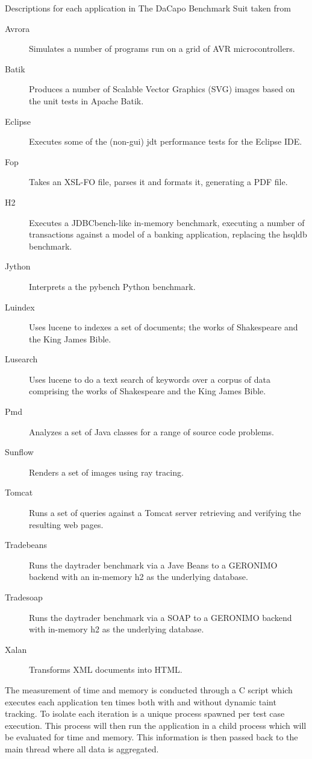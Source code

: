 \begin{table}[H]
  \centering
  \caption{Descriptions for each application in The DaCapo Benchmark Suit taken from \textcite{dacapoBench}}
    \label{table:DaCapoTests}
    \begin{description}
        \item [Avrora] Simulates a number of programs run on a grid of AVR microcontrollers.
        \item [Batik] Produces a number of Scalable Vector Graphics (SVG) images based on the unit tests in Apache Batik.
        \item [Eclipse] Executes some of the (non-gui) jdt performance tests for the Eclipse IDE.
        \item [Fop] Takes an XSL-FO file, parses it and formats it, generating a PDF file.
        \item [H2] Executes a JDBCbench-like in-memory benchmark, executing a number of transactions against a model of a banking application, replacing the hsqldb benchmark.
        \item [Jython] Interprets a the pybench Python benchmark.
        \item [Luindex] Uses lucene to indexes a set of documents; the works of Shakespeare and the King James Bible.
        \item [Lusearch] Uses lucene to do a text search of keywords over a corpus of data comprising the works of Shakespeare and the King James Bible.
        \item [Pmd] Analyzes a set of Java classes for a range of source code problems.
        \item [Sunflow] Renders a set of images using ray tracing.
        \item [Tomcat] Runs a set of queries against a Tomcat server retrieving and verifying the resulting web pages.
        \item [Tradebeans] Runs the daytrader benchmark via a Jave Beans to a GERONIMO backend with an in-memory h2 as the underlying database.
        \item [Tradesoap] Runs the daytrader benchmark via a SOAP to a GERONIMO backend with in-memory h2 as the underlying database.
        \item [Xalan] Transforms XML documents into HTML.
    \end{description}
\end{table}

The measurement of time and memory is conducted through a C script which executes each application ten times both with and without dynamic taint tracking. To isolate each iteration is a unique process spawned per test case execution. This process will then run the application in a child process which will be evaluated for time and memory. This information is then passed back to the main thread where all data is aggregated.  